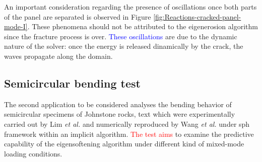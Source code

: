 \documentclass[preprint,12pt,a4paper]{elsarticle}
\begin{document}
An important consideration regarding the presence of oscillations once both parts of the panel are separated is observed in Figure \ref{fig:Reactions-cracked-panel-mode-I}. These phenomena should not be attributed to the eigenerosion algorithm since the fracture process is over. \textcolor{blue}{These oscillations} are due to the dynamic nature of the solver: once the energy is released dinamically by the crack, the waves propagate
along the domain.


\subsection{Semicircular bending test}
\label{sec:3.2}

The second application to be considered analyses the bending behavior of semicircular specimens of Johnstone rocks, text which were experimentally carried out by Lim {\it et
  al.} \cite{LIM_1993} and numerically reproduced by Wang {\it et
  al.}\cite{Wang_2020} under \acrshort{sph} framework within an
implicit algorithm. \textcolor{red}{The test aims} to examine the predictive capability of the eigensoftening algorithm under different kind of mixed-mode loading conditions.
\end{document}
